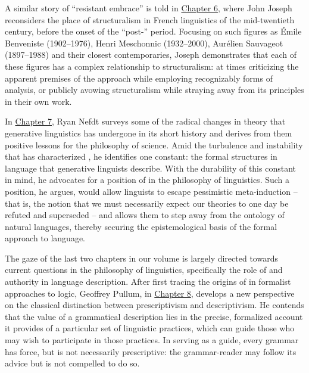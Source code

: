 \documentclass[output=paper]{langscibook}
\begin{document}
A similar story of ``resistant embrace'' is told in \hyperref[chap:joseph]{Chapter 6}, where John Joseph reconsiders the place of structuralism in French linguistics of the mid-twentieth century, before the onset of the ``post-'' period. Focusing on such figures as Émile Benveniste (1902--1976), Henri Meschonnic (1932--2000), Aurélien Sauvageot (1897--1988) and their closest contemporaries, Joseph demonstrates that each of these figures has a complex relationship to structuralism: at times criticizing the apparent premises of the approach while employing recognizably  forms of analysis, or publicly avowing structuralism while straying away from its principles in their own work.

In \hyperref[chap:nefdt]{Chapter 7}, Ryan Nefdt surveys some of the radical changes in theory that generative linguistics has undergone in its short history and derives from them positive lessons for the philosophy of science. Amid the turbulence and instability that has characterized , he identifies one constant: the formal structures in language that generative linguists describe. With the durability of this constant in mind, he advocates for a position of  in the philosophy of linguistics. Such a position, he argues, would allow linguists to escape pessimistic meta-induction -- that is, the notion that we must necessarily expect our theories to one day be refuted and superseded -- and allows them to step away from the ontology of natural languages, thereby securing the epistemological basis of the formal approach to language.

The gaze of the last two chapters in our volume is largely directed towards current questions in the philosophy of linguistics, specifically the role of  and authority in language description. After first tracing the origins of  in formalist approaches to logic, Geoffrey Pullum, in \hyperref[chap:pullum]{Chapter 8}, develops a new perspective on the classical distinction between prescriptivism and descriptivism. He contends that the value of a grammatical description lies in the precise, formalized account it provides of a particular set of linguistic practices, which can guide those who may wish to participate in those practices. In serving as a guide, every grammar has  force, but is not necessarily prescriptive: the grammar-reader may follow its advice but is not compelled to do so.
\end{document}
